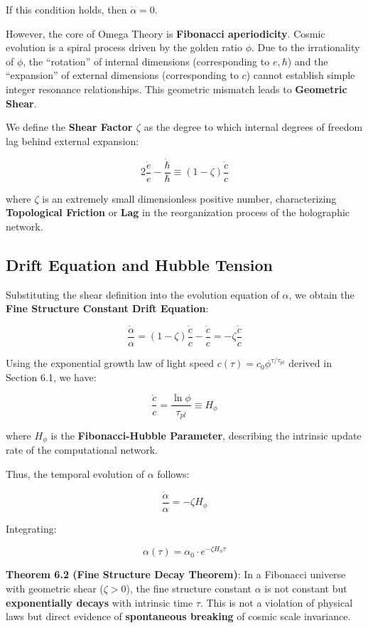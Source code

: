 If this condition holds, then $\dot{\alpha} = 0$.

However, the core of Omega Theory is \textbf{Fibonacci aperiodicity}. Cosmic evolution is a spiral process driven by the golden ratio $\phi$. Due to the irrationality of $\phi$, the ``rotation'' of internal dimensions (corresponding to $e, \hbar$) and the ``expansion'' of external dimensions (corresponding to $c$) cannot establish simple integer resonance relationships. This geometric mismatch leads to \textbf{Geometric Shear}.

We define the \textbf{Shear Factor $\zeta$} as the degree to which internal degrees of freedom lag behind external expansion:

\[2\frac{\dot{e}}{e} - \frac{\dot{\hbar}}{\hbar} \equiv (1 - \zeta) \frac{\dot{c}}{c}\]

where $\zeta$ is an extremely small dimensionless positive number, characterizing \textbf{Topological Friction} or \textbf{Lag} in the reorganization process of the holographic network.

\subsection{Drift Equation and Hubble Tension}

Substituting the shear definition into the evolution equation of $\alpha$, we obtain the \textbf{Fine Structure Constant Drift Equation}:

\[\frac{\dot{\alpha}}{\alpha} = (1 - \zeta) \frac{\dot{c}}{c} - \frac{\dot{c}}{c} = -\zeta \frac{\dot{c}}{c}\]

Using the exponential growth law of light speed $c(\tau) = c_0 \phi^{\tau/\tau_{pl}}$ derived in Section 6.1, we have:

\[\frac{\dot{c}}{c} = \frac{\ln \phi}{\tau_{pl}} \equiv H_\phi\]

where $H_\phi$ is the \textbf{Fibonacci-Hubble Parameter}, describing the intrinsic update rate of the computational network.

Thus, the temporal evolution of $\alpha$ follows:

\[\frac{\dot{\alpha}}{\alpha} = -\zeta H_\phi\]

Integrating:

\[\alpha(\tau) = \alpha_0 \cdot e^{-\zeta H_\phi \tau}\]

\textbf{Theorem 6.2 (Fine Structure Decay Theorem)}:
In a Fibonacci universe with geometric shear ($\zeta > 0$), the fine structure constant $\alpha$ is not constant but \textbf{exponentially decays} with intrinsic time $\tau$. This is not a violation of physical laws but direct evidence of \textbf{spontaneous breaking} of cosmic scale invariance.

